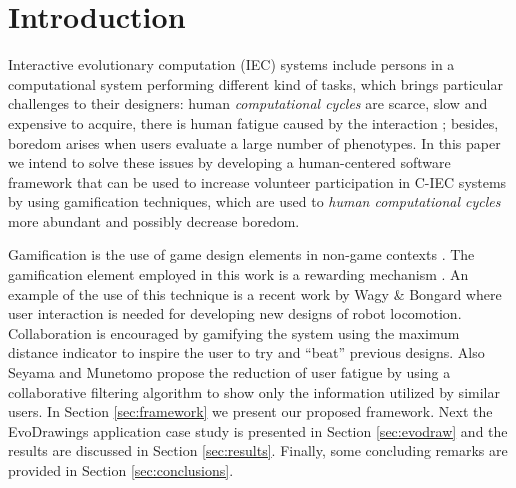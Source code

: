 \section{Introduction}

Interactive evolutionary computation (IEC) systems include persons in
a computational system performing different kind of tasks, which brings particular challenges
to their designers: human {\em computational cycles} are scarce, slow
and expensive to acquire, there is human 
fatigue caused by the interaction \cite{ie1}; besides, boredom arises
when users evaluate a large number of phenotypes. In this paper we
intend to solve these issues by developing a  human-centered 
\cite{gasson2003human} software framework that can be used to 
increase volunteer participation in C-IEC systems by using
gamification techniques, which are used to {\em human computational
  cycles} more abundant and possibly decrease boredom.

Gamification is the use of game design elements in non-game contexts \cite{deterding2011game}. 
The gamification element employed in this work is a rewarding mechanism
\cite{dubois2013understanding}. An example of the use of this technique is a recent
work by Wagy \& Bongard \cite{wagy2014collective} where user interaction is
needed for developing new designs of robot locomotion.
Collaboration is encouraged by gamifying the system using the maximum distance
indicator to inspire the user to try and ``beat'' previous designs. Also Seyama and
Munetomo \cite{seyama2016development} propose the reduction of user
fatigue by using a collaborative filtering algorithm to show only the
information utilized by similar users. In Section \ref{sec:framework}
we present our proposed framework. Next the EvoDrawings application case study 
is presented in Section \ref{sec:evodraw} and the
results are discussed in Section \ref{sec:results}. Finally, some concluding
remarks are provided in Section \ref{sec:conclusions}.

